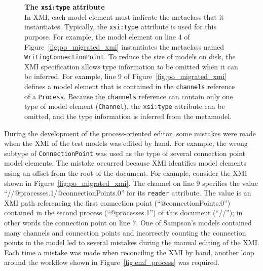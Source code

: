 \begin{figure}[tbp]
	\begin{framed}
	\textbf{The \texttt{xsi:type} attribute} \\
	In XMI, each model element must indicate the metaclass that it instantiates. Typically, the \texttt{xsi:type} attribute is used for this purpose. For example, the model element on line 4 of Figure~\ref{fig:po_migrated_xmi} instantiates the metaclass named \texttt{Wr\-i\-ti\-ngCo\-nn\-ec\-ti\-o\-nPo\-i\-nt}. To reduce the size of models on disk, the XMI specification allows type information to be omitted when it can be inferred. For example, line 9 of Figure~\ref{fig:po_migrated_xmi} defines a model element that is contained in the \texttt{ch\-an\-ne\-ls} reference of a \texttt{Pr\-o\-ce\-ss}. Because the \texttt{ch\-an\-ne\-ls} reference can contain only one type of model element (\texttt{Ch\-an\-n\-el}), the \texttt{xsi:type} attribute can be omitted, and the type information is inferred from the metamodel.
	\end{framed}
\end{figure}



During the development of the process-oriented editor, some mistakes were made when the XMI of the test models was edited by hand. For example, the wrong subtype of \texttt{Co\-nn\-ec\-ti\-onPo\-in\-t} was used as the type of several connection point model elements. The mistake occurred because XMI identifies model elements using an offset from the root of the document. For example, consider the XMI shown in Figure~\ref{fig:po_migrated_xmi}. The channel on line 9 specifies the value ``//@processes.1/@connectionPoints.0'' for its \texttt{re\-ad\-er} attribute. The value is an XMI path referencing the first connection point (``@connectionPoints.0'') contained in the second process (``@processes.1'') of this document (``//''); in other words the connection point on line 7. One of Sampson's models contained many channels and connection points and incorrectly counting the connection points in the model led to several mistakes during the manual editing of the XMI. Each time a mistake was made when reconciling the XMI by hand, another loop around the workflow shown in Figure~\ref{fig:emf_process} was required.

